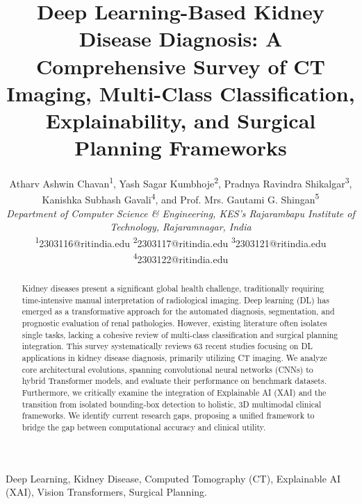 \documentclass[journal]{IEEEtran}
\title{Deep Learning-Based Kidney Disease Diagnosis: A Comprehensive Survey of CT Imaging, Multi-Class Classification, Explainability, and Surgical Planning Frameworks}
\author{
    Atharv Ashwin Chavan\textsuperscript{1}, Yash Sagar Kumbhoje\textsuperscript{2}, Pradnya Ravindra Shikalgar\textsuperscript{3}, \\ Kanishka Subhash Gavali\textsuperscript{4}, and Prof. Mrs. Gautami G. Shingan\textsuperscript{5} \\
    \vspace{0.5em}
    \textit{Department of Computer Science \& Engineering, KES's Rajarambapu Institute of Technology, Rajaramnagar, India} \\
    \vspace{0.5em}
    \textsuperscript{1}2303116@ritindia.edu \quad \textsuperscript{2}2303117@ritindia.edu \quad \textsuperscript{3}2303121@ritindia.edu \quad \textsuperscript{4}2303122@ritindia.edu
}
\begin{document}
\maketitle

\begin{abstract}
Kidney diseases present a significant global health challenge, traditionally requiring time-intensive manual interpretation of radiological imaging. Deep learning (DL) has emerged as a transformative approach for the automated diagnosis, segmentation, and prognostic evaluation of renal pathologies. However, existing literature often isolates single tasks, lacking a cohesive review of multi-class classification and surgical planning integration. This survey systematically reviews 63 recent studies focusing on DL applications in kidney disease diagnosis, primarily utilizing CT imaging. We analyze core architectural evolutions, spanning convolutional neural networks (CNNs) to hybrid Transformer models, and evaluate their performance on benchmark datasets. Furthermore, we critically examine the integration of Explainable AI (XAI) and the transition from isolated bounding-box detection to holistic, 3D multimodal clinical frameworks. We identify current research gaps, proposing a unified framework to bridge the gap between computational accuracy and clinical utility.
\end{abstract}

\begin{IEEEkeywords}
Deep Learning, Kidney Disease, Computed Tomography (CT), Explainable AI (XAI), Vision Transformers, Surgical Planning.
\end{IEEEkeywords}






\end{document}
